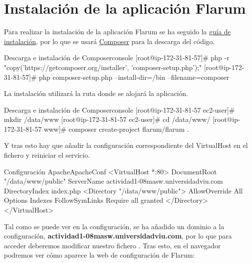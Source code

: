 \documentclass{\ClassPath/viu-tfm-template}
\begin{document}
\section{Instalación de la aplicación Flarum}

Para realizar la instalación de la aplicación Flarum se ha seguido la \href{https://docs.flarum.org/install#installing}{guía de instalación}, por lo que se usará \href{https://getcomposer.org/}{Composer} para la descarga del código.

\begin{mycode}{Descarga e instalación de Composer}{console}{{\scriptsize }}
[root@ip-172-31-81-57]# php -r "copy('https://getcomposer.org/installer', 'composer-setup.php');"
[root@ip-172-31-81-57]# php composer-setup.php --install-dir=/bin --filename=composer
\end{mycode}


La instalación utilizará la ruta  donde se alojará la aplicación.

\begin{mycode}{Descarga e instalación de Composer}{console}{{\small }}
[root@ip-172-31-81-57 ec2-user]# mkdir /data/www
[root@ip-172-31-81-57 ec2-user]# cd /data/www/
[root@ip-172-31-81-57 www]# composer create-project flarum/flarum .
\end{mycode}

Y tras esto hay que añadir la configuración correspondiente del VirtualHost en el fichero  y reiniciar el servicio.

\begin{mycode}{Configuración Apache}{ApacheConf}{}
<VirtualHost *:80>
  DocumentRoot "/data/www/public"
  ServerName actividad1-08masw.universidadviu.com
  DirectoryIndex index.php
  <Directory "/data/www/public">
    AllowOverride All
    Options Indexes FollowSymLinks
    Require all granted
  </Directory>
</VirtualHost>
\end{mycode}

Tal como se puede ver en la configuración, se ha añadido un dominio a la configuración, \textbf{actividad1-08masw.universidadviu.com}, por lo que para acceder deberemos modificar nuestro fichero . Tras esto, en el navegador podremos ver cómo aparece la web de configuración de Flarum:
\end{document}
